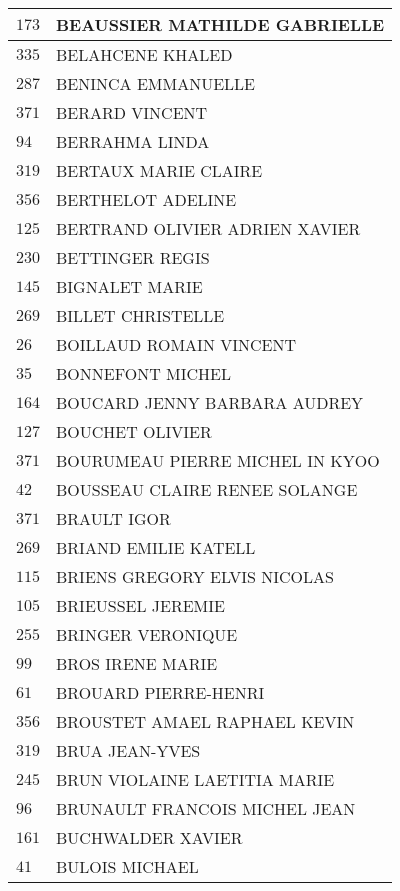 \begin{xltabular}{\linewidth}{|l|X|}
    \hline
    $173$ & BEAUSSIER MATHILDE GABRIELLE \\
    \hline
    $335$ & BELAHCENE KHALED \\
    \hline
    $287$ & BENINCA EMMANUELLE \\
    \hline
    $371$ & BERARD VINCENT \\
    \hline
    $94$ & BERRAHMA LINDA \\
    \hline
    $319$ & BERTAUX MARIE CLAIRE \\
    \hline
    $356$ & BERTHELOT ADELINE \\
    \hline
    $125$ & BERTRAND OLIVIER ADRIEN XAVIER \\
    \hline
    $230$ & BETTINGER REGIS \\
    \hline
    $145$ & BIGNALET MARIE \\
    \hline
    $269$ & BILLET CHRISTELLE \\
    \hline
    $26$ & BOILLAUD ROMAIN VINCENT \\
    \hline
    $35$ & BONNEFONT MICHEL \\
    \hline
    $164$ & BOUCARD JENNY BARBARA AUDREY \\
    \hline
    $127$ & BOUCHET OLIVIER \\
    \hline
    $371$ & BOURUMEAU PIERRE MICHEL IN KYOO \\
    \hline
    $42$ & BOUSSEAU CLAIRE RENEE SOLANGE \\
    \hline
    $371$ & BRAULT IGOR \\
    \hline
    $269$ & BRIAND EMILIE KATELL \\
    \hline
    $115$ & BRIENS GREGORY ELVIS NICOLAS \\
    \hline
    $105$ & BRIEUSSEL JEREMIE \\
    \hline
    $255$ & BRINGER VERONIQUE \\
    \hline
    $99$ & BROS IRENE MARIE \\
    \hline
    $61$ & BROUARD PIERRE-HENRI \\
    \hline
    $356$ & BROUSTET AMAEL RAPHAEL KEVIN \\
    \hline
    $319$ & BRUA JEAN-YVES \\
    \hline
    $245$ & BRUN VIOLAINE LAETITIA MARIE \\
    \hline
    $96$ & BRUNAULT FRANCOIS MICHEL JEAN \\
    \hline
    $161$ & BUCHWALDER XAVIER \\
    \hline
    $41$ & BULOIS MICHAEL \\

\end{xltabular}
